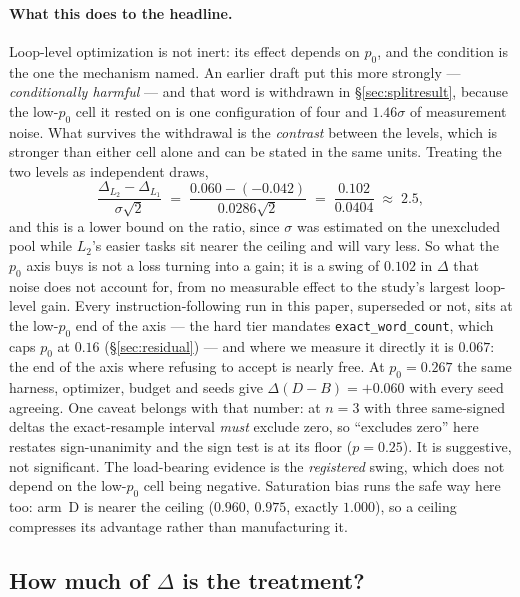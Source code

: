 \documentclass[11pt]{article}
\newcommand{\dd}{\ensuremath{\Delta}}
\begin{document}
\paragraph{What this does to the headline.} Loop-level optimization is not inert: its effect
depends on $p_0$, and the condition is the one the mechanism named. An earlier draft put this
more strongly --- \emph{conditionally harmful} --- and that word is withdrawn in
\S\ref{sec:splitresult}, because the low-$p_0$ cell it rested on is one configuration of four
and $1.46\sigma$ of measurement noise. What survives the withdrawal is the \emph{contrast}
between the levels, which is stronger than either cell alone and can be stated in the same
units. Treating the two levels as independent draws,
\[
\frac{\dd_{L_2} - \dd_{L_1}}{\sigma\sqrt{2}}
 \;=\; \frac{0.060 - (-0.042)}{0.0286\sqrt{2}} \;=\; \frac{0.102}{0.0404} \;\approx\; 2.5 ,
\]
and this is a lower bound on the ratio, since $\sigma$ was estimated on the unexcluded pool
while $L_2$'s easier tasks sit nearer the ceiling and will vary less. So what the $p_0$ axis buys
is not a loss turning into a gain; it is a swing of $0.102$ in $\dd$ that noise does not account
for, from no measurable effect to the study's largest loop-level gain. Every
instruction-following run in this paper, superseded or not, sits at the low-$p_0$ end of the axis
--- the hard tier mandates \texttt{exact\_word\_count}, which caps $p_0$ at $0.16$
(\S\ref{sec:residual}) --- and where we measure it directly it is $0.067$: the end of the axis
where refusing to accept is nearly free. At $p_0 = 0.267$ the same harness, optimizer, budget and
seeds give $\dd(D-B) = +0.060$ with every seed agreeing. One caveat belongs with that number: at
$n=3$ with three same-signed deltas the exact-resample interval \emph{must} exclude zero, so
``excludes zero'' here restates sign-unanimity and the sign test is at its floor ($p = 0.25$). It
is suggestive, not significant. The load-bearing evidence is the \emph{registered} swing, which
does not depend on the low-$p_0$ cell being negative. Saturation bias runs the safe way here too:
arm~D is nearer the ceiling ($0.960$, $0.975$, exactly $1.000$), so a ceiling compresses its
advantage rather than manufacturing it.

\subsection{How much of \texorpdfstring{$\dd$}{Delta} is the treatment?}
\label{sec:decomp}
\end{document}
